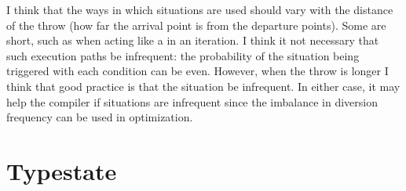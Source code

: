 \documentclass[10pt]{amsart}
\begin{document}
I think that the ways in which situations are used should vary with
the distance of the throw (how far the arrival point is from the
departure points).  Some are short, such as when acting like a
\texttt{} in an iteration.  I think it not necessary that
such execution paths be infrequent: the probability of the situation
being triggered with each condition can be even.  However, when the
throw is longer I think that good practice is that the situation be
infrequent.  In either case, it may help the compiler if situations
are infrequent since the imbalance in diversion frequency can be used
in optimization.



\section{Typestate}

\end{document}
